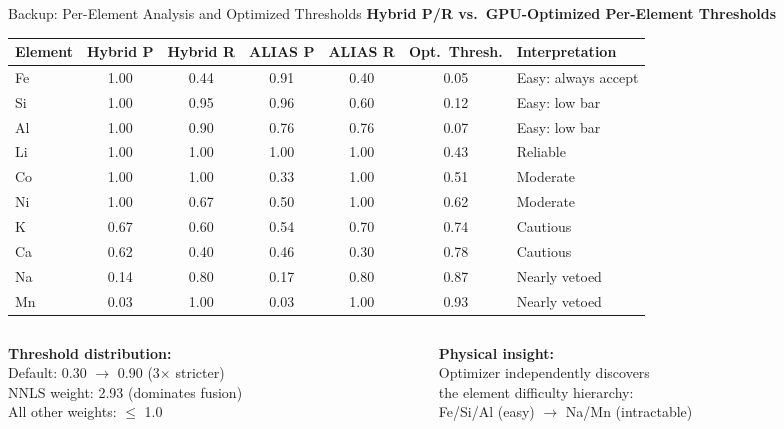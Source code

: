 \documentclass[aspectratio=169,10pt]{beamer}
\begin{document}
\begin{frame}{Backup: Per-Element Analysis and Optimized Thresholds}
	\centering
	{\small\textbf{Hybrid P/R vs.\ GPU-Optimized Per-Element Thresholds}}\\[0.3em]
	{\scriptsize
	\begin{tabular}{lcccccl}
		\toprule
		\textbf{Element} & \textbf{Hybrid P} & \textbf{Hybrid R} & \textbf{ALIAS P} & \textbf{ALIAS R} & \textbf{Opt.\ Thresh.} & \textbf{Interpretation} \\
		\midrule
		Fe & \alert{1.00} & 0.44 & 0.91 & 0.40 & \alert{0.05} & Easy: always accept \\
		Si & \alert{1.00} & 0.95 & 0.96 & 0.60 & \alert{0.12} & Easy: low bar \\
		Al & \alert{1.00} & 0.90 & 0.76 & 0.76 & \alert{0.07} & Easy: low bar \\
		Li & \alert{1.00} & 1.00 & 1.00 & 1.00 & 0.43 & Reliable \\
		Co & \alert{1.00} & 1.00 & 0.33 & 1.00 & 0.51 & Moderate \\
		Ni & \alert{1.00} & 0.67 & 0.50 & 1.00 & 0.62 & Moderate \\
		K  & 0.67 & 0.60 & 0.54 & 0.70 & 0.74 & Cautious \\
		Ca & 0.62 & 0.40 & 0.46 & 0.30 & 0.78 & Cautious \\
		Na & 0.14 & 0.80 & 0.17 & 0.80 & \alert{0.87} & Nearly vetoed \\
		Mn & 0.03 & 1.00 & 0.03 & 1.00 & \alert{0.93} & Nearly vetoed \\
		\bottomrule
	\end{tabular}}

	\vspace{0.5em}
	\begin{columns}[T]
		\begin{column}{0.48\textwidth}
			\textbf{Threshold distribution:}\\[0.2em]
			{\small Default: 0.30 $\to$ \alert{0.90} (3$\times$ stricter)\\
			NNLS weight: \alert{2.93} (dominates fusion)\\
			All other weights: $\leq$ 1.0}
		\end{column}
		\begin{column}{0.48\textwidth}
			\textbf{Physical insight:}\\
			{\small Optimizer independently discovers\\
			the element difficulty hierarchy:\\
			Fe/Si/Al (easy) $\to$ Na/Mn (intractable)}
		\end{column}
	\end{columns}
\end{frame}
\end{document}
